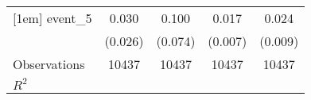 {\begin{tabular}{l*{4}{c}}
[1em]
event\_5             &       0.030         &       0.100         &       0.017\sym{**} &       0.024\sym{***}\\
                    &     (0.026)         &     (0.074)         &     (0.007)         &     (0.009)         \\
\hline
Observations        &       10437         &       10437         &       10437         &       10437         \\
\(R^{2}\)           &                     &                     &                     &                     \\
\hline\hline
\end{tabular}
}
